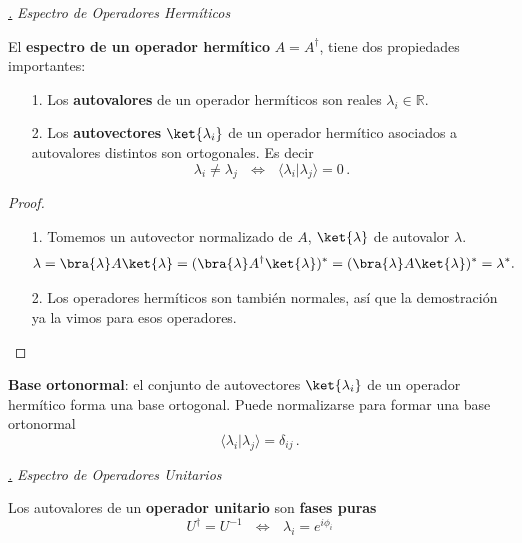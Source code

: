 \documentclass[a4paper,11pt]{book} %
\numberwithin{equation}{chapter}
\newcommand{\braket}[2]{\langle #1|#2\rangle}
\def\subsubiContadorIt{\par\addtocounter{subsubsection}{1}\underline{\it\thesubsubsection.}\hskip0.5cm \setcounter{subsubsubsectionIt}{0}}
\newcommand{\SubsubiIt}[1]{
		\subsubiContadorIt \textit{#1}
	}
\newcounter{subsubsubsectionIt}[subsubsection]
\begin{document}
			\SubsubiIt{Espectro de Operadores Hermíticos}

\begin{mybox_gray2}{}
El \textbf{espectro de un operador hermítico}  $A = A^\dagger$,  tiene dos propiedades importantes:
\begin{itemize}
	\item[1.] Los \textbf{autovalores} de un operador hermíticos son reales $\lambda_i \in {\mathbb R}$.
	\item[2.] Los \textbf{autovectores} $\ket{\lambda_i}$ de un operador hermítico asociados a autovalores distintos son ortogonales. Es decir
	\begin{equation} \label{ec_op_hermitico_autovec_ortogonal}
	\lambda_i\neq \lambda_j ~~~\Longleftrightarrow ~~~\braket{\lambda_i}{\lambda_j} = 0\, .
	\end{equation}
\end{itemize}

\end{mybox_gray2}

\begin{proof}
\begin{itemize}
	\item[1.] Tomemos un autovector normalizado de $A$, $\ket{\lambda}$ de autovalor $\lambda$.
\begin{equation}
\lambda = \bra{\lambda}A\ket{\lambda} =  (\bra{\lambda}A^\dagger\ket{\lambda})^* = (\bra{\lambda}A\ket{\lambda})^*= \lambda^* .~~~
\end{equation}   

	\item[2.] Los operadores hermíticos son también normales, así que la demostración ya la vimos para esos operadores.
\end{itemize}
\end{proof}

\textbf{Base ortonormal}: el conjunto de autovectores $\ket{\lambda_i}$ de un operador hermítico forma una base ortogonal. Puede normalizarse para formar una base ortonormal
	\begin{equation} \label{ec_op_hermitico_autovec_ortonorm}
	\braket{\lambda_i}{\lambda_j} = \delta_{ij} \, .
	\end{equation}


			\SubsubiIt{Espectro de Operadores Unitarios}

\begin{mybox_gray2}{}

Los autovalores de un \textbf{operador unitario} son \textbf{fases puras}
\begin{equation}
U^\dagger = U^{-1} ~~~\Longleftrightarrow ~~~\lambda_i = e^{i\phi_i}
\end{equation} 
\end{mybox_gray2}
\end{document}
